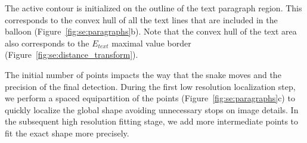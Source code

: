 The active contour is initialized on the outline of the text paragraph region.
This corresponds to the convex hull of all the text lines that are included in the balloon (Figure~\ref{fig:se:paragraphs}b).
Note that the convex hull of the text area also corresponds to the $E_{text}$ maximal value border (Figure~\ref{fig:se:distance_transform}).



The initial number of points impacts the way that the snake moves and the precision of the final detection.
During the first low resolution localization step, we perform a spaced equipartition of the points (Figure~\ref{fig:se:paragraphs}c) to quickly localize the global shape avoiding unnecessary stops on image details.
In the subsequent high resolution fitting stage, we add more intermediate points to fit the exact shape more precisely.


